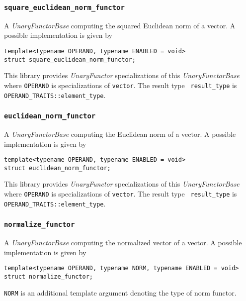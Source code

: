 \documentclass[oneside]{book}
\begin{document}
\subsubsection{\texttt{square\_euclidean\_norm\_functor}}
A \textit{UnaryFunctorBase} computing the squared Euclidean norm of a vector.
A possible implementation is given by
\begin{verbatim}
template<typename OPERAND, typename ENABLED = void>
struct square_euclidean_norm_functor;
\end{verbatim}

This library provides \textit{UnaryFunctor} specializations of this \textit{UnaryFunctorBase}
where \texttt{OPERAND} is specializations of \texttt{vector}. The result type        \texttt{
result\_type} is \texttt{OPERAND\_TRAITS::element\_type\textrangle}.

\subsubsection{\texttt{euclidean\_norm\_functor}}
A \textit{UnaryFunctorBase} computing the Euclidean norm of a vector.
A possible implementation is given by
\begin{verbatim}
template<typename OPERAND, typename ENABLED = void>
struct euclidean_norm_functor;
\end{verbatim}

This library provides \textit{UnaryFunctor} specializations of this \textit{UnaryFunctorBase}
where \texttt{OPERAND} is specializations of \texttt{vector}. The result type        \texttt{
result\_type} is \texttt{OPERAND\_TRAITS::element\_type}.

\subsubsection{\texttt{normalize\_functor}}
A \textit{UnaryFunctorBase} computing the normalized vector of a vector.
A possible implementation is given by
\begin{verbatim}
template<typename OPERAND, typename NORM, typename ENABLED = void>
struct normalize_functor;
\end{verbatim}
\texttt{NORM} is an additional template argument denoting the type of norm functor.\newline
\end{document}
